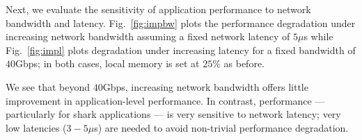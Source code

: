 Next, we evaluate the sensitivity of application performance to network bandwidth and latency. Fig.~\ref{fig:impbw} plots the performance degradation under increasing network bandwidth assuming a fixed network latency of $5\mu$s while Fig.~\ref{fig:impl} plots degradation under increasing latency for a fixed bandwidth of $40$Gbps; in both cases, local memory is set at $25\%$ as before.

We see that beyond $40$Gbps, increasing network bandwidth offers little improvement in application-level performance. 
%
%
In contrast, performance --- particularly for shark applications --- is very sensitive to network latency; very low latencies ($3-5\mu$s) are needed to avoid non-trivial performance degradation.

